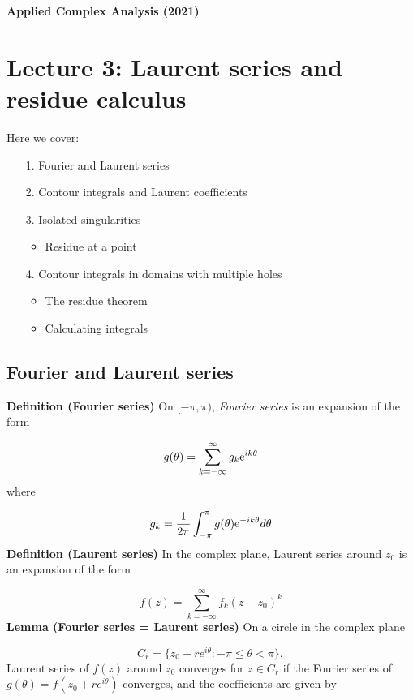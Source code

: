 \documentclass[12pt,a4paper]{article}
\def\E{ {\rm e} }
\begin{document}
\textbf{Applied Complex Analysis (2021)}

\section{Lecture 3: Laurent series and residue calculus}
Here we cover:

\begin{itemize}
\item[1. ] Fourier and Laurent series


\item[2. ] Contour integrals and Laurent coefficients


\item[3. ] Isolated singularities

\begin{itemize}
\item Residue at a point

\end{itemize}

\item[4. ] Contour integrals in domains with multiple holes

\begin{itemize}
\item The residue theorem


\item Calculating integrals

\end{itemize}
\end{itemize}
\subsection{Fourier and Laurent series}
\textbf{Definition (Fourier series)} On $[-\pi, \pi)$,  \emph{Fourier series} is an expansion of the form

\[
    g(\theta) = \sum_{k=-\infty}^\infty g_k \E^{i k \theta}
\]
where

\[
g_k = {1\over 2 \pi} \int_{-\pi}^\pi g(\theta) \E^{-i k \theta} d \theta
\]
\textbf{Definition (Laurent series)} In the complex plane, Laurent series around $z_0$ is an expansion of the form

\[
    f(z) = \sum_{k=-\infty}^\infty f_k (z-z_0)^k
\]
\textbf{Lemma (Fourier series = Laurent series)} On a circle in the complex plane

\[
    C_r = \{z_0 + re^{i \theta} : -\pi \leq \theta < \pi \},
\]
Laurent series of $f(z)$ around $z_0$ converges for $z \in C_r$ if the Fourier series of $g(\theta) = f(z_0 + r e^{i \theta})$ converges, and the coefficients are given by
\end{document}
